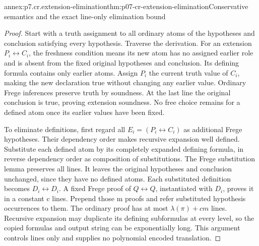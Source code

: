 \begin{annexitem}{annex:p7.cr.extension-elimination}{thm:p07-cr-extension-elimination}{Conservative semantics and the exact line-only elimination bound}
\begin{proof}
Start with a truth assignment to all ordinary atoms of the hypotheses
and conclusion satisfying every hypothesis. Traverse the derivation.
For an extension \(P_i\leftrightarrow C_i\), the freshness condition
means its new atom has no assigned earlier role and is absent from
the fixed original hypotheses and conclusion. Its defining formula
contains only earlier atoms. Assign \(P_i\) the current truth value
of \(C_i\), making the new declaration true without changing any
earlier value. Ordinary Frege inferences preserve truth by soundness.
At the last line the original conclusion is true, proving extension
soundness. No free choice remains for a defined atom once its
earlier values have been fixed.

To eliminate definitions, first regard all
\(E_i=(P_i\leftrightarrow C_i)\) as additional Frege hypotheses.
Their dependency order makes recursive expansion well defined.
Substitute each defined atom by its completely expanded defining
formula, in reverse dependency order as composition of substitutions.
The Frege substitution lemma preserves all lines. It leaves the
original hypotheses and conclusion unchanged, since they have no
defined atoms. Each substituted definition becomes
\(D_i\leftrightarrow D_i\). A fixed Frege proof of
\(Q\leftrightarrow Q\), instantiated with \(D_i\), proves it
in a constant c lines. Prepend those m proofs and refer substituted
hypothesis occurrences to them. The ordinary proof has at most
\(\lambda(\pi)+cm\) lines. Recursive expansion may duplicate
its defining subformulas at every level, so the copied formulas
and output string can be exponentially long. This argument
controls lines only and supplies no polynomial encoded translation.
\end{proof}
\end{annexitem}

